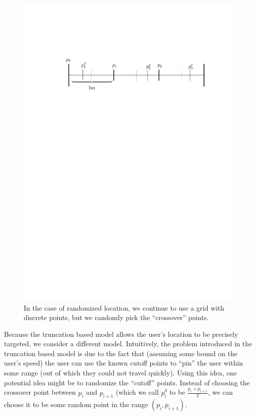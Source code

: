\documentclass{article}
\begin{document}
\begin{figure}[h]
  \label{fig:randgrid}
  \includegraphics[width=\textwidth]{threat_model_diagram_randomized_truncation.pdf}
  \caption{In the case of randomized location, we continue to use a
    grid with discrete points, but we randomly pick the ``crossover''
    points.}
\end{figure}

Because the truncation based model allows the user's location to be
precisely targeted, we consider a different model.  Intuitively, the
problem introduced in the truncation based model is due to the fact
that (assuming some bound on the user's speed) the user can use the
known cutoff points to ``pin'' the user within some range (out of
which they could not travel quickly).  Using this idea, one potential
idea might be to randomize the ``cutoff'' points.  Instead of choosing
the crossover point between $p_i$ and $p_{i+1}$ (which we call
$p_i^{\delta}$ to be $\frac{p_i+p_{i+1}}{2}$, we can choose it to be
some random point in the range $(p_i,p_{i+1})$.
\end{document}
